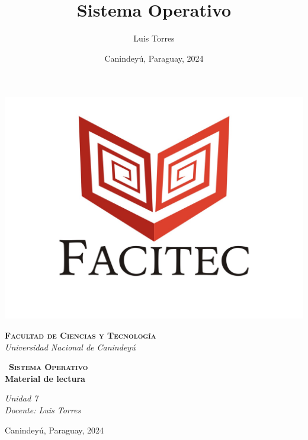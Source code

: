 \documentclass[11pt]{report}
\begin{document}
	
	\title{Sistema Operativo}
	\author{Luis Torres}
	\date{Canindeyú, Paraguay, 2024}
	
	\begin{titlepage}
		\begin{center}
			\includegraphics[width=0.3\linewidth]{Imagenes/facitecLogo1.jpg}
			\vspace{15pt}
			
			{\scshape\LARGE\textbf{Facultad de Ciencias y Tecnología}\\}
			{\Large\itshape Universidad Nacional de Canindeyú\\}
			
			\vspace{1cm}
			{\huge\scshape\ \textbf{Sistema Operativo}\\}
			\vspace{1cm}
			{\huge\bfseries Material de lectura\\}
			
			{\Large\itshape Unidad 7\\}
			\vspace{1cm}
			{\Large\itshape Docente: Luis Torres\\}
			
			\vfill
			\vfill
			
			{\large Canindeyú, Paraguay, 2024\\}
		\end{center}
	\end{titlepage}
	
	\newpage
	
	\begin{singlespacing}
		\tableofcontents
	\end{singlespacing}
	
	
			
							
	
	
	
	
\end{document}
